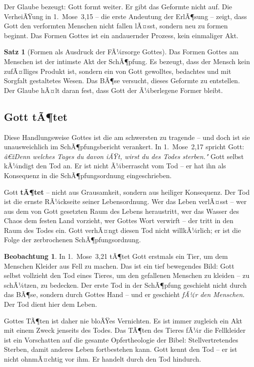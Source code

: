 ﻿\documentclass[a4paper,12pt]{article}
\theoremstyle{definition}
\newtheorem{theorem}{Satz}[section]
\newtheorem{observation}{Beobachtung}[section]
\begin{document}
Der Glaube bezeugt: Gott formt weiter. Er gibt das Geformte nicht auf. Die
VerheiÃŸung in 1.~Mose~3,15 -- die erste Andeutung der ErlÃ¶sung -- zeigt, dass
Gott den verformten Menschen nicht fallen lÃ¤sst, sondern neu zu formen beginnt.
Das Formen Gottes ist ein andauernder Prozess, kein einmaliger Akt.

\begin{theorem}[Formen als Ausdruck der FÃ¼rsorge Gottes]
	Das Formen Gottes am Menschen ist der intimste Akt der SchÃ¶pfung. Es bezeugt,
	dass der Mensch kein zufÃ¤lliges Produkt ist, sondern ein von Gott gewolltes,
	bedachtes und mit Sorgfalt gestaltetes Wesen. Das BÃ¶se versucht, dieses Geformte
	zu entstellen. Der Glaube hÃ¤lt daran fest, dass Gott der Ã¼berlegene Former bleibt.
\end{theorem}

\subsection{Gott tÃ¶tet}

Diese Handlungsweise Gottes ist die am schwersten zu tragende -- und doch ist
sie unausweichlich im SchÃ¶pfungsbericht verankert. In 1.~Mose~2,17 spricht Gott:
\textit{â€žDenn welches Tages du davon iÃŸt, wirst du des Todes sterben."} Gott
selbst kÃ¼ndigt den Tod an. Er ist nicht Ã¼berrascht vom Tod -- er hat ihn als
Konsequenz in die SchÃ¶pfungsordnung eingeschrieben.

Gott \textbf{tÃ¶tet} -- nicht aus Grausamkeit, sondern aus heiliger Konsequenz.
Der Tod ist die ernste RÃ¼ckseite seiner Lebensordnung. Wer das Leben verlÃ¤sst --
wer aus dem von Gott gesetzten Raum des Lebens heraustritt, wer das Wasser des
Chaos dem festen Land vorzieht, wer Gottes Wort verwirft -- der tritt in den Raum
des Todes ein. Gott verhÃ¤ngt diesen Tod nicht willkÃ¼rlich; er ist die Folge der
zerbrochenen SchÃ¶pfungsordnung.

\begin{observation}
	In 1.~Mose~3,21 tÃ¶tet Gott erstmals ein Tier, um dem Menschen Kleider aus
	Fell zu machen. Das ist ein tief bewegendes Bild: Gott selbst vollzieht den
	Tod eines Tieres, um den gefallenen Menschen zu kleiden -- zu schÃ¼tzen, zu
	bedecken. Der erste Tod in der SchÃ¶pfung geschieht nicht durch das BÃ¶se, sondern
	durch Gottes Hand -- und er geschieht \textit{fÃ¼r den Menschen}. Der Tod dient
	hier dem Leben.
\end{observation}

Gottes TÃ¶ten ist daher nie bloÃŸes Vernichten. Es ist immer zugleich ein Akt mit
einem Zweck jenseits des Todes. Das TÃ¶ten des Tieres fÃ¼r die Fellkleider ist ein
Vorschatten auf die gesamte Opfertheologie der Bibel: Stellvertretendes Sterben,
damit anderes Leben fortbestehen kann. Gott kennt den Tod -- er ist nicht
ohnmÃ¤chtig vor ihm. Er handelt durch den Tod hindurch.
\end{document}
